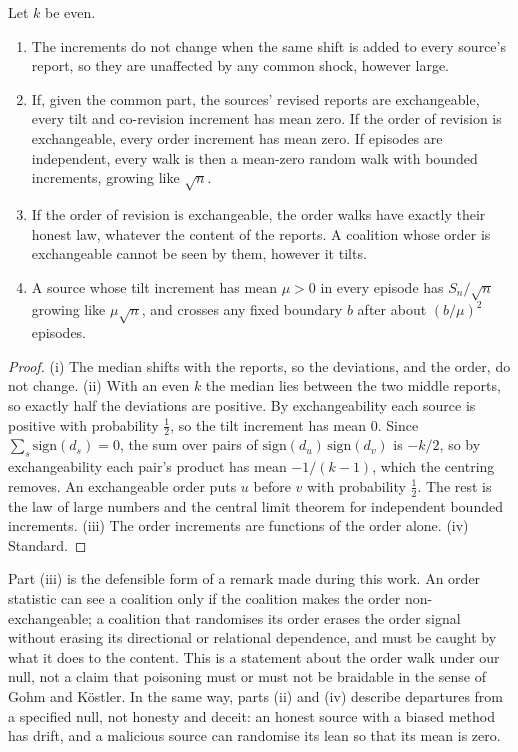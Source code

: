 \documentclass[11pt]{article}
\theoremstyle{definition}\newtheorem{definition}[theorem]{Definition}\newtheorem{remark}[theorem]{Remark}\newtheorem{example}[theorem]{Example}\newtheorem{problem}[theorem]{Open problem}\crefname{problem}{Problem}{Problems}
\begin{document}
\begin{proposition}\label{prop:dmmemory}
Let $k$ be even.
\begin{enumerate}
\item[(i)] The increments do not change when the same shift is added to every source's report, so they are unaffected by any common shock, however large.
\item[(ii)] If, given the common part, the sources' revised reports are exchangeable, every tilt and co-revision increment has mean zero. If the order of revision is exchangeable, every order increment has mean zero. If episodes are independent, every walk is then a mean-zero random walk with bounded increments, growing like $\sqrt n$.
\item[(iii)] If the order of revision is exchangeable, the order walks have exactly their honest law, whatever the content of the reports. A coalition whose order is exchangeable cannot be seen by them, however it tilts.
\item[(iv)] A source whose tilt increment has mean $\mu>0$ in every episode has $S_n/\sqrt n$ growing like $\mu\sqrt n$, and crosses any fixed boundary $b$ after about $(b/\mu)^2$ episodes.
\end{enumerate}
\end{proposition}

\begin{proof}
(i) The median shifts with the reports, so the deviations, and the order, do not change. (ii) With an even $k$ the median lies between the two middle reports, so exactly half the deviations are positive. By exchangeability each source is positive with probability $\tfrac12$, so the tilt increment has mean $0$. Since $\sum_s\mathrm{sign}(d_s)=0$, the sum over pairs of $\mathrm{sign}(d_u)\,\mathrm{sign}(d_v)$ is $-k/2$, so by exchangeability each pair's product has mean $-1/(k-1)$, which the centring removes. An exchangeable order puts $u$ before $v$ with probability $\tfrac12$. The rest is the law of large numbers and the central limit theorem for independent bounded increments. (iii) The order increments are functions of the order alone. (iv) Standard.
\end{proof}

Part (iii) is the defensible form of a remark made during this work. An order statistic can see a coalition only if the coalition makes the order non-exchangeable; a coalition that randomises its order erases the order signal without erasing its directional or relational dependence, and must be caught by what it does to the content. This is a statement about the order walk under our null, not a claim that poisoning must or must not be braidable in the sense of Gohm and K\"ostler. In the same way, parts (ii) and (iv) describe departures from a specified null, not honesty and deceit: an honest source with a biased method has drift, and a malicious source can randomise its lean so that its mean is zero.
\end{document}
